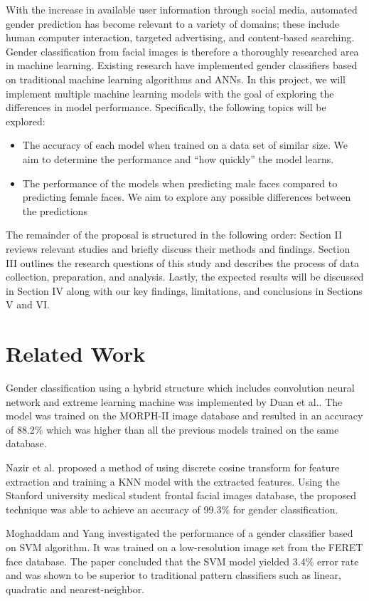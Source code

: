 \documentclass[conference]{IEEEtran}
\begin{document}
With the increase in available user information through social media, automated gender prediction has become relevant to a variety of domains; these include human computer interaction, targeted advertising, and content-based searching\cite{khan2014comparative}. Gender classification from facial images is therefore a thoroughly researched area in machine learning. Existing research have implemented gender classifiers based on traditional machine learning algorithms and ANNs. In this project, we will implement multiple machine learning models with the goal of exploring the differences in model performance. Specifically, the following topics will be explored:
\begin{itemize}
  \item The accuracy of each model when trained on a data set of similar size. We aim to determine the performance and “how quickly” the model learns.
  \item The performance of the models when predicting male faces compared to predicting female faces. We aim to explore any possible differences between the predictions
\end{itemize}
The remainder of the proposal is structured in the following order: Section II reviews relevant studies and briefly discuss their methods and findings. Section III outlines the research questions of this study and describes the process of data collection, preparation, and analysis. Lastly, the expected results will be discussed in Section IV along with our key findings, limitations, and conclusions in Sections V and VI.

\section{Related Work}
Gender classification using a hybrid structure which includes convolution neural network and extreme learning machine was implemented by Duan et al.\cite{duan2018hybrid}. The model was trained on the MORPH-II image database and resulted in an accuracy of 88.2\% which was higher than all the previous models trained on the same database. 

Nazir et al.\cite{nazir2010feature} proposed a method of using discrete cosine transform for feature extraction and training a KNN model with the extracted features. Using the Stanford university medical student frontal facial images database, the proposed technique was able to achieve an accuracy of 99.3\% for gender classification.

Moghaddam and Yang\cite{moghaddam2002learning} investigated the performance of a gender classifier based on SVM algorithm. It was trained on a low-resolution image set from the FERET face database. The paper concluded that the SVM model yielded 3.4\% error rate and was shown to be superior to traditional pattern classifiers such as linear, quadratic and nearest-neighbor.
\end{document}
